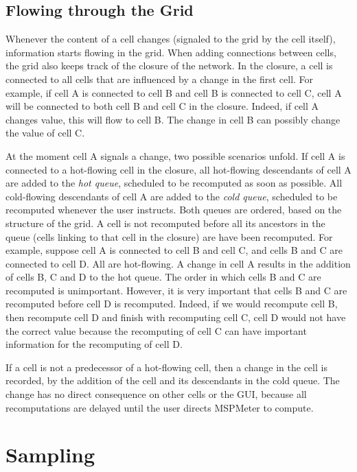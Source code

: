 \documentclass{article}
\begin{document}
\subsection{Flowing through the Grid}

Whenever the content of a cell changes (signaled to the grid by the cell itself), information starts flowing in the grid. When adding connections between cells, the grid also keeps track of the closure of the network. In the closure, a cell is connected to all cells that are influenced by a change in the first cell. For example, if cell A is connected to cell B and cell B is connected to cell C, cell A will be connected to both cell B and cell C in the closure. Indeed, if cell A changes value, this will flow to cell B. The change in cell B can possibly change the value of cell C. 

At the moment cell A signals a change, two possible scenarios unfold. If cell A is connected to a hot-flowing cell in the closure, all hot-flowing descendants of cell A are added to the \emph{hot queue}, scheduled to be recomputed as soon as possible. All cold-flowing descendants of cell A are added to the \emph{cold queue}, scheduled to be recomputed whenever the user instructs. Both queues are ordered, based on the structure of the grid. A cell is not recomputed before all its ancestors in the queue (cells linking to that cell in the closure) are have been recomputed. For example, suppose cell A is connected to cell B and cell C, and cells B and C are connected to cell D. All are hot-flowing. A change in cell A results in the addition of cells B, C and D to the hot queue. The order in which cells B and C are recomputed is unimportant. However, it is very important that cells B and C are recomputed before cell D is recomputed. Indeed, if we would recompute cell B, then recompute cell D and finish with recomputing cell C, cell D would not have the correct value because the recomputing of cell C can have important information for the recomputing of cell D. 

If a cell is not a predecessor of a hot-flowing cell, then a change in the cell is recorded, by the addition of the cell and its descendants in the cold queue. The change has no direct consequence on other cells or the GUI, because all recomputations are delayed until the user directs MSPMeter to compute.



\section{Sampling}
\end{document}
